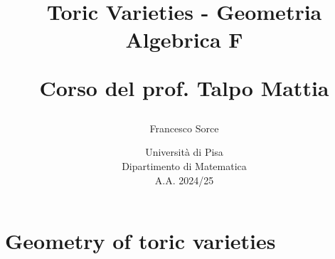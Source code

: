 \documentclass[a4paper]{report}
\title{\huge Toric Varieties - Geometria Algebrica F
\vspace{0.7cm}

\Large Corso del prof. Talpo Mattia}
\author{\Large Francesco Sorce}
\date{Università di Pisa\\
Dipartimento di Matematica\\
A.A. 2024/25}
\begin{document}
\maketitle

\tableofcontents
\newpage



\part{Geometry of toric varieties}






\appendix


\end{document}
